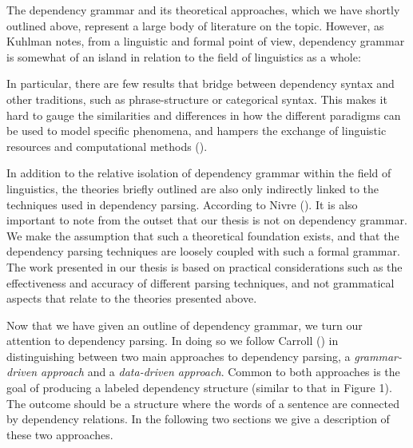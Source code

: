 \documentclass[10pt]{article}
\begin{document}
The dependency grammar and its theoretical approaches, which we have shortly outlined above, represent a large body of literature on the topic. However, as Kuhlman notes, from a linguistic and formal point of view, dependency grammar is somewhat of an island in relation to the field of linguistics as a whole:

\begin{displayquote}
In particular, there are few results that bridge between dependency syntax and other traditions, such as phrase-structure or categorical syntax. This makes it hard to gauge the similarities and differences in how the different paradigms can be used to model specific phenomena, and hampers the exchange of linguistic resources and computational methods (\cite{kuhlmann2010dependency}).
\end{displayquote}

In addition to the relative isolation of dependency grammar within the field of linguistics, the theories briefly outlined are also only indirectly linked to the techniques used in dependency parsing. According to Nivre  (\cite{Nivre05dependencygrammar}). It is also important to note from the outset that our thesis is not on dependency grammar. We make the assumption that such a theoretical foundation exists, and that the dependency parsing techniques are loosely coupled with such a formal grammar. The work presented in our thesis is based on practical considerations such as the effectiveness and accuracy of different parsing techniques, and not grammatical aspects that relate to the theories presented above.

Now that we have given an outline of dependency grammar, we turn our attention to dependency parsing. In doing so we follow Carroll (\cite{Carrol:00}) in distinguishing between two main approaches to dependency parsing, a \textit{grammar-driven approach} and a \textit{data-driven approach}. Common to both approaches is the goal of producing a labeled dependency structure (similar to that in Figure 1). The outcome should be a structure where the words of a sentence are connected by dependency relations. In the following two sections we give a description of these two approaches.

\end{document}

